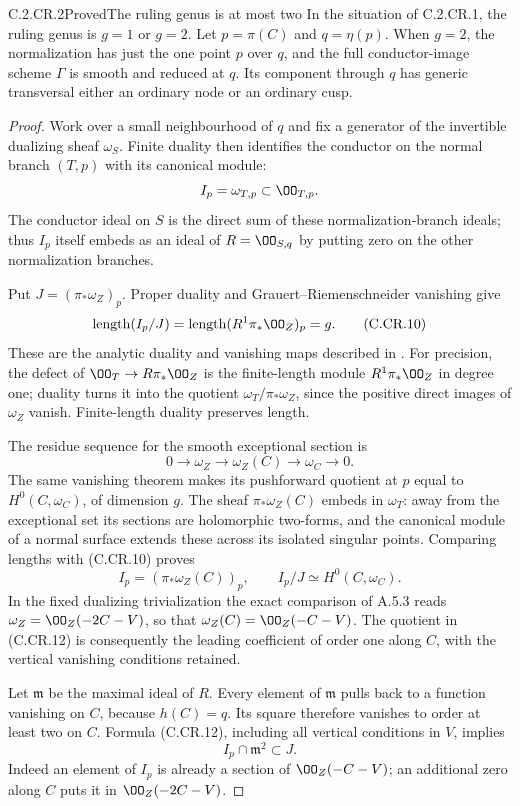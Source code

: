 \begin{statement}{C.2.CR.2}{Proved}{The ruling genus is at most two}
In the situation of C.2.CR.1, the ruling genus is $g=1$ or
$g=2$. Let $p=\pi(C)$ and $q=\eta(p)$. When $g=2$, the
normalization has just the one point $p$ over $q$, and the
full conductor-image scheme $\Gamma$ is smooth and reduced
at $q$. Its component through $q$ has generic transversal
either an ordinary node or an ordinary cusp.
\end{statement}
\begin{proof}
Work over a small neighbourhood of $q$ and fix a generator
of the invertible dualizing sheaf $\omega_S$. Finite
duality then identifies the conductor on the normal branch
$(T,p)$ with its canonical module:
\[
 I_p=\omega_{T,p}\subset\OO_{T,p}.
\]
The conductor ideal on $S$ is the direct sum of these
normalization-branch ideals; thus $I_p$ itself embeds
as an ideal of $R=\OO_{S,q}$ by putting zero on the other
normalization branches.

Put $J=(\pi_*\omega_Z)_p$. Proper duality and
Grauert--Riemenschneider vanishing give
\[
 \operatorname{length}(I_p/J)
   =\operatorname{length}(R^1\pi_*\OO_Z)_p=g.
 \tag{C.CR.10}
\]
These are the analytic duality and vanishing maps described
in \cite[Sections~2.2.2--2.2.5]{vanStraten1987}.
For precision, the defect of $\OO_T\to R\pi_*\OO_Z$ is
the finite-length module $R^1\pi_*\OO_Z$ in degree one;
duality turns it into the quotient
$\omega_T/\pi_*\omega_Z$, since the positive direct
images of $\omega_Z$ vanish. Finite-length duality
preserves length.

The residue sequence for the smooth exceptional section is
\[
 0\longrightarrow\omega_Z\longrightarrow\omega_Z(C)
   \longrightarrow\omega_C\longrightarrow0 .
 \tag{C.CR.11}
\]
The same vanishing theorem makes its pushforward quotient
at $p$ equal to $H^0(C,\omega_C)$, of dimension $g$.
The sheaf $\pi_*\omega_Z(C)$ embeds in $\omega_T$:
away from the exceptional set its sections are holomorphic
two-forms, and the canonical module of a normal surface
extends these across its isolated singular points.
Comparing lengths with (C.CR.10) proves
\[
 I_p=(\pi_*\omega_Z(C))_p,\qquad
 I_p/J\simeq H^0(C,\omega_C).
 \tag{C.CR.12}
\]
In the fixed dualizing trivialization the exact comparison
of A.5.3 reads
$\omega_Z=\OO_Z(-2C-V)$, so that
$\omega_Z(C)=\OO_Z(-C-V)$. The quotient in (C.CR.12)
is consequently the leading coefficient of order one
along $C$, with the vertical vanishing conditions retained.

Let $\mathfrak m$ be the maximal ideal of $R$. Every
element of $\mathfrak m$ pulls back to a function vanishing
on $C$, because $h(C)=q$. Its square therefore vanishes
to order at least two on $C$. Formula (C.CR.12), including
all vertical conditions in $V$, implies
\[
                 I_p\cap\mathfrak m^2\subset J.
 \tag{C.CR.13}
\]
Indeed an element of $I_p$ is already a section of
$\OO_Z(-C-V)$; an additional zero along $C$ puts it
in $\OO_Z(-2C-V)$.


\end{proof}
